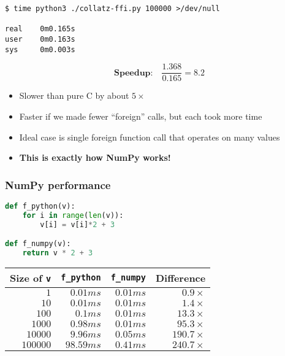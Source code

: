 \documentclass[rgb,dvipsnames,aspectratio=169,xcolor=table]{beamer}
\begin{document}
\begin{frame}[fragile]
\begin{verbatim}
$ time python3 ./collatz-ffi.py 100000 >/dev/null

real    0m0.165s
user    0m0.163s
sys     0m0.003s
\end{verbatim}

\[
  \textbf{Speedup:} \quad \frac{1.368}{0.165} = 8.2
\]

\pause

\begin{itemize}
\item Slower than pure C by about $5\times$
\item Faster if we made fewer ``foreign'' calls, but each took more
  time
\item Ideal case is single foreign function call that operates on many
  values
\item \textbf{This is exactly how NumPy works!}
\end{itemize}

\end{frame}

\begin{frame}[fragile]
  \frametitle{NumPy performance}

\begin{lstlisting}[language=Python]
def f_python(v):
    for i in range(len(v)):
        v[i] = v[i]*2 + 3

def f_numpy(v):
    return v * 2 + 3
\end{lstlisting}

  \begin{center}
  \begin{tabular}{rrrr}
    Size of \texttt{v} & \texttt{f\_python} & \texttt{f\_numpy} & Difference \\\hline
    $1$ & $0.01ms$ & $0.01ms$ & $0.9\times$ \\
    $10$ & $0.01ms$ & $0.01ms$ & $1.4\times$ \\
    $100$ & $0.1ms$ & $0.01ms$ & $13.3\times$ \\
    $1000$ & $0.98ms$ & $0.01ms$ & $95.3\times$ \\
    $10000$ & $9.96ms$ & $0.05ms$ & $190.7\times$ \\
    $100000$ & $98.59ms$ & $0.41ms$ & $240.7\times$ \\
  \end{tabular}
  \end{center}

\end{frame}
\end{document}
